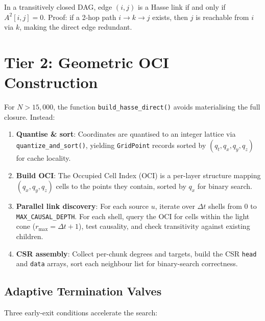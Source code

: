 \documentclass[11pt, a4paper, openany]{book}
\newcommand{\code}[1]{\texttt{#1}}
\newcommand{\func}[1]{\texttt{\color{structure}#1}}
\begin{document}
\begin{theorem}
  In a transitively closed DAG, edge $(i,j)$ is a Hasse link if and only if
  $A^2[i,j] = 0$.  Proof: if a 2-hop path $i \to k \to j$ exists, then $j$ is
  reachable from $i$ via $k$, making the direct edge redundant.
\end{theorem}

\section{Tier 2: Geometric OCI Construction}

For $N > 15{,}000$, the function \func{build\_hasse\_direct()} avoids
materialising the full closure.  Instead:

\begin{enumerate}
  \item \textbf{Quantise \& sort}: Coordinates are quantised to an integer
        lattice via \func{quantize\_and\_sort()}, yielding \code{GridPoint}
        records sorted by $(q_t, q_x, q_y, q_z)$ for cache locality.
  \item \textbf{Build OCI}: The Occupied Cell Index (OCI) is a per-layer
        structure mapping $(q_x, q_y, q_z)$ cells to the points they contain,
        sorted by $q_x$ for binary search.
  \item \textbf{Parallel link discovery}: For each source $u$, iterate over
        $\Delta t$ shells from 0 to \code{MAX\_CAUSAL\_DEPTH}.  For each
        shell, query the OCI for cells within the light cone
        ($r_{\max} = \Delta t + 1$), test causality, and check transitivity
        against existing children.
  \item \textbf{CSR assembly}: Collect per-chunk degrees and targets, build
        the CSR \code{head} and \code{data} arrays, sort each neighbour list
        for binary-search correctness.
\end{enumerate}

\subsection{Adaptive Termination Valves}

Three early-exit conditions accelerate the search:
\end{document}

